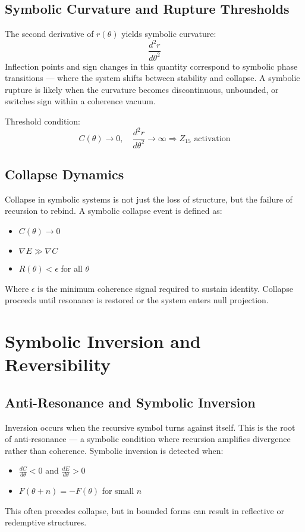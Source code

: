 \documentclass[12pt]{article}
\begin{document}
\subsection*{Symbolic Curvature and Rupture Thresholds}
The second derivative of $r(\theta)$ yields symbolic curvature:
\[ \frac{d^2r}{d\theta^2} \]
Inflection points and sign changes in this quantity correspond to symbolic phase transitions — where the system shifts between stability and collapse. A symbolic rupture is likely when the curvature becomes discontinuous, unbounded, or switches sign within a coherence vacuum.

Threshold condition:
\[ C(\theta) \rightarrow 0, \quad \frac{d^2r}{d\theta^2} \rightarrow \infty \Rightarrow Z_{15} \text{ activation} \]

\subsection*{Collapse Dynamics}
Collapse in symbolic systems is not just the loss of structure, but the failure of recursion to rebind. A symbolic collapse event is defined as:
\begin{itemize}
  \item $C(\theta) \to 0$
  \item $\nabla E \gg \nabla C$
  \item $R(\theta) < \epsilon$ for all $\theta$
\end{itemize}
Where $\epsilon$ is the minimum coherence signal required to sustain identity. Collapse proceeds until resonance is restored or the system enters null projection.

\section{Symbolic Inversion and Reversibility}

\subsection*{Anti-Resonance and Symbolic Inversion}
Inversion occurs when the recursive symbol turns against itself. This is the root of anti-resonance — a symbolic condition where recursion amplifies divergence rather than coherence. Symbolic inversion is detected when:
\begin{itemize}
  \item $\frac{dC}{d\theta} < 0$ and $\frac{dE}{d\theta} > 0$
  \item $F(\theta + n) = -F(\theta)$ for small $n$
\end{itemize}
This often precedes collapse, but in bounded forms can result in reflective or redemptive structures.
\end{document}
